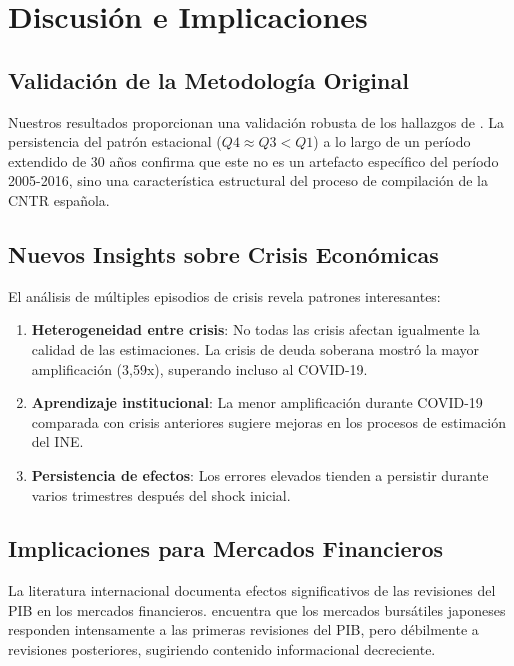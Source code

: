 \documentclass{article}
\begin{document}
\section{Discusión e Implicaciones}

\subsection{Validación de la Metodología Original}

Nuestros resultados proporcionan una validación robusta de los hallazgos de \citet{pavia2017}. La persistencia del patrón estacional ($Q4 \approx Q3 < Q1$) a lo largo de un período extendido de 30 años confirma que este no es un artefacto específico del período 2005-2016, sino una característica estructural del proceso de compilación de la CNTR española.

\subsection{Nuevos Insights sobre Crisis Económicas}

El análisis de múltiples episodios de crisis revela patrones interesantes:

\begin{enumerate}
\item \textbf{Heterogeneidad entre crisis}: No todas las crisis afectan igualmente la calidad de las estimaciones. La crisis de deuda soberana mostró la mayor amplificación (3,59x), superando incluso al COVID-19.

\item \textbf{Aprendizaje institucional}: La menor amplificación durante COVID-19 comparada con crisis anteriores sugiere mejoras en los procesos de estimación del INE.

\item \textbf{Persistencia de efectos}: Los errores elevados tienden a persistir durante varios trimestres después del shock inicial.
\end{enumerate}

\subsection{Implicaciones para Mercados Financieros}

La literatura internacional documenta efectos significativos de las revisiones del PIB en los mercados financieros. \citet{iizuka2017} encuentra que los mercados bursátiles japoneses responden intensamente a las primeras revisiones del PIB, pero débilmente a revisiones posteriores, sugiriendo contenido informacional decreciente.
\end{document}

